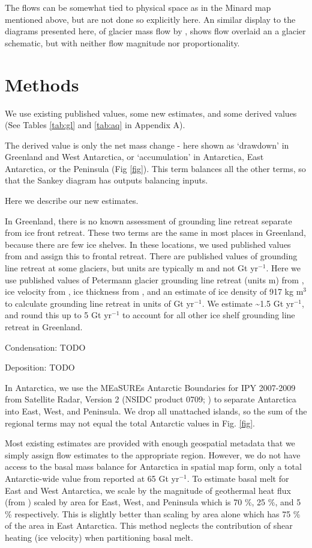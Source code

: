 \documentclass[jog]{igs}
\begin{document}
  The flows can be somewhat tied to physical space as in the Minard map mentioned above, but are not done so explicitly here. An similar display to the diagrams presented here, of glacier mass flow by \citet[Fig. 2]{cogley_2011}, shows flow overlaid an a glacier schematic, but with neither flow magnitude nor proportionality.

\section{Methods}

We use existing published values, some new estimates, and some derived values (See Tables \ref{tab:gl} and \ref{tab:aq} in Appendix A).

The derived value is only the net mass change - here shown as `drawdown' in Greenland and West Antarctica, or `accumulation' in Antarctica, East Antarctica, or the Peninsula (Fig \ref{fig}). This term balances all the other terms, so that the Sankey diagram has outputs balancing inputs.

Here we describe our new estimates.

In Greenland, there is no known assessment of grounding line retreat separate from ice front retreat. These two terms are the same in most places in Greenland, because there are few ice shelves. In these locations, we used published values from \citet{kochtitzky_2023} and assign this to frontal retreat. There are published values of grounding line retreat at some glaciers, but units are typically m and not Gt yr$^{-1}$. Here we use published values of Petermann glacier grounding line retreat (units m) from \citet{millan_2022}, ice velocity from \citet{millan_2022}, ice thickness from \citet{ciraci_2023}, and an estimate of ice density of 917 kg m$^{3}$ to calculate grounding line retreat in units of Gt yr$^{-1}$. We estimate \sim 1.5 Gt yr$^{-1}$, and round this up to 5 Gt yr$^{-1}$ to account for all other ice shelf grounding line retreat in Greenland.

Condensation: TODO

Deposition: TODO

In Antarctica, we use the MEaSUREs Antarctic Boundaries for IPY 2007-2009 from Satellite Radar, Version 2 (NSIDC product 0709; \citet{mouginot_2017,rignot_2013}) to separate Antarctica into East, West, and Peninsula. We drop all unattached islands, so the sum of the regional terms may not equal the total Antarctic values in Fig. \ref{fig}.

Most existing estimates are provided with enough geospatial metadata that we simply assign flow estimates to the appropriate region. However, we do not have access to the basal mass balance for Antarctica in spatial map form, only a total Antarctic-wide value from \citet{pattyn_2010} reported at 65 Gt yr$^{-1}$. To estimate basal melt for East and West Antarctica, we scale by the magnitude of geothermal heat flux (from \citet{shapiro_2004}) scaled by area for East, West, and Peninsula which is 70 \%, 25 \%, and 5 \% respectively. This is slightly better than scaling by area alone which has 75 \% of the area in East Antarctica. This method neglects the contribution of shear heating (ice velocity) when partitioning basal melt.
\end{document}
